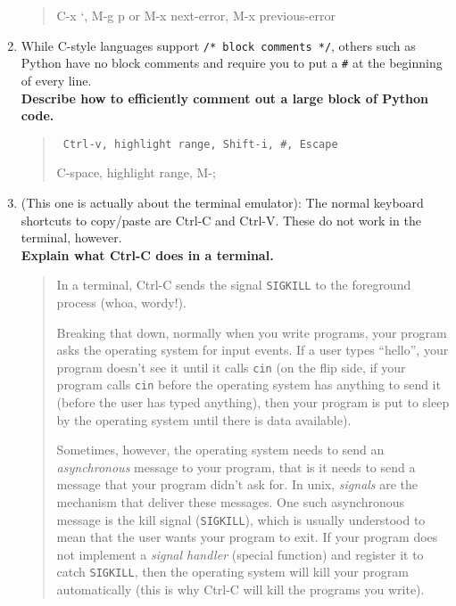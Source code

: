 \documentclass{article}
\begin{document}
\begin{enumerate}
\begin{quote}
      {\color{red} C-x `, M-g p} or {\color{red} M-x next-error, M-x previous-error}
    \end{quote}
  \item While C-style languages support \texttt{/* block comments */}, others
    such as Python have no block comments and require you to put a \texttt{\#}
    at the beginning of every line.\\
    \textbf{Describe how to efficiently comment out a large block of Python code.}
    \begin{quote}\tt
      \color{blue} Ctrl-v, highlight range, Shift-i, \#, Escape

      \color{red} C-space, highlight range, M-;
    \end{quote}
  \item (This one is actually about the terminal emulator): The normal
    keyboard shortcuts to copy/paste are Ctrl-C and Ctrl-V. These do not work
    in the terminal, however.\\
    \textbf{Explain what Ctrl-C does in a terminal.}
    \begin{quote}\small
      \color{violet} In a terminal, Ctrl-C sends the signal \texttt{SIGKILL} to
      the foreground process (whoa, wordy!).

      Breaking that down, normally when you write programs, your program asks
      the operating system for input events. If a user types ``hello'', your
      program doesn't see it until it calls \texttt{cin} (on the flip side, if
      your program calls \texttt{cin} before the operating system has anything
      to send it (before the user has typed anything), then your program is
      put to sleep by the operating system until there is data available).

      Sometimes, however, the operating system needs to send an
      \emph{asynchronous} message to your program, that is it needs to send a
      message that your program didn't ask for. In unix, \emph{signals} are
      the mechanism that deliver these messages. One such asynchronous message
      is the kill signal (\texttt{SIGKILL}), which is usually understood to
      mean that the user wants your program to exit. If your program does not
      implement a \emph{signal handler} (special function) and register it to
      catch \texttt{SIGKILL}, then the operating system will kill your program
      automatically (this is why Ctrl-C will kill the programs you write).


\end{quote}
\end{enumerate}
\end{document}
